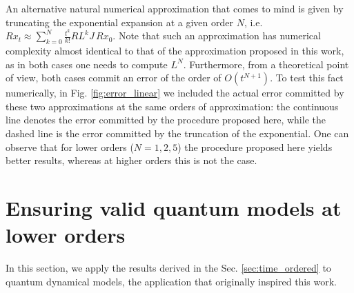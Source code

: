 \documentclass[10pt,aps,pra,twocolumn,showpacs,superscriptaddress,nobalancelastpage,notitlepage,nofootinbib,longbibliography]{revtex4-2}
\begin{document}
An alternative natural numerical approximation that comes to mind is given by truncating the exponential expansion at a given order $N$, i.e. $Rx_t\approx \sum_{k=0}^{N} \frac{t^k}{k!} RL^k J\, Rx_0$. Note that such an approximation has numerical complexity almost identical to that of the approximation proposed in this work, as in both cases one needs to compute $L^N$. Furthermore, from a theoretical point of view, both cases commit an error of the order of $O(t^{N+1})$. To test this fact numerically, in Fig. \ref{fig:error_linear} we included the actual error committed by these two approximations at the same orders of approximation: the continuous line denotes the error committed by the procedure proposed here, while the dashed line is the error committed by the truncation of the exponential. One can observe that for lower orders ($N=1,2,5$) the procedure proposed here yields better results, whereas at higher orders this is not the case. 

\section{Ensuring valid quantum models at lower orders}
\label{sec:cptp_second_order}

In this section, we apply the results derived in the Sec. \ref{sec:time_ordered} to quantum dynamical models, the application that originally inspired this work. 
\end{document}
